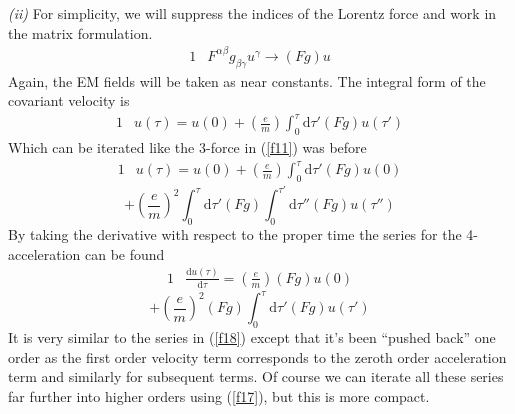 \documentclass[]{article}
\numberwithin{equation}{subsection}
\begin{document}
\noindent \emph{(ii)} For simplicity, we will suppress the indices of the Lorentz force and work in the matrix formulation.
\begin{alignat}{1}
	\label{f16}	&F^{\alpha\beta}g_{\beta\gamma}u^{\gamma}\rightarrow(Fg)u
\end{alignat}
Again, the EM fields will be taken as near constants. The integral form of the covariant velocity is  
\begin{alignat}{1}
	\label{f17}	&u(\tau)=u(0)+(\frac{e}{m})\int_0^{\tau}\mathrm{d}\tau'(Fg)u(\tau')
\end{alignat}
Which can be iterated like the 3-force in (\ref{f11}) was before  
\begin{alignat}{1}
	\label{f18}	&u(\tau)=u(0)+(\frac{e}{m})\int_0^{\tau}\mathrm{d}\tau'(Fg)u(0)
\end{alignat}
$$
	+(\frac{e}{m})^{2}\int_0^{\tau}\mathrm{d}\tau'(Fg)\int_0^{\tau'}\mathrm{d}\tau''(Fg)u(\tau'')
$$
By taking the derivative with respect to the proper time the series for the 4-acceleration can be found  
\begin{alignat}{1}
	\label{f19}	&\frac{\mathrm{d}u(\tau)}{\mathrm{d}\tau}=(\frac{e}{m})(Fg)u(0)
\end{alignat}
$$
	+(\frac{e}{m})^{2}(Fg)\int_0^{\tau}\mathrm{d}\tau'(Fg)u(\tau')
$$
It is very similar to the series in (\ref{f18}) except that it's been ``pushed back'' one order as the first order velocity term corresponds to the zeroth order acceleration term and similarly for subsequent terms. Of course we can iterate all these series far further into higher orders using (\ref{f17}), but this is more compact.\\
\end{document}
